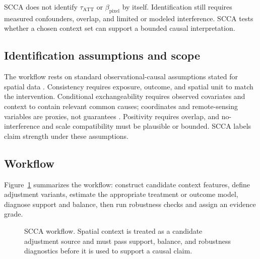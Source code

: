\documentclass{article}
\begin{document}
SCCA does not identify $\tau_{\mathrm{ATT}}$ or $\beta_{\mathrm{pixel}}$ by itself. Identification still requires measured confounders, overlap, and limited or modeled interference. SCCA tests whether a chosen context set can support a bounded causal interpretation.

\subsection{Identification assumptions and scope}

The workflow rests on standard observational-causal assumptions stated for spatial data \citep{imbens2015causal,pearl2009causality}. Consistency requires exposure, outcome, and spatial unit to match the intervention. Conditional exchangeability requires observed covariates and context to contain relevant common causes; coordinates and remote-sensing variables are proxies, not guarantees \citep{gilbert2021spatialconfounding}. Positivity requires overlap, and no-interference and scale compatibility must be plausible or bounded. SCCA labels claim strength under these assumptions.

\subsection{Workflow}

Figure~\ref{fig:scca_workflow} summarizes the workflow: construct candidate context features, define adjustment variants, estimate the appropriate treatment or outcome model, diagnose support and balance, then run robustness checks and assign an evidence grade.

\begin{figure}[htbp]
\centering
{}
\caption{SCCA workflow. Spatial context is treated as a candidate adjustment source and must pass support, balance, and robustness diagnostics before it is used to support a causal claim.}
\label{fig:scca_workflow}
\end{figure}
\end{document}
